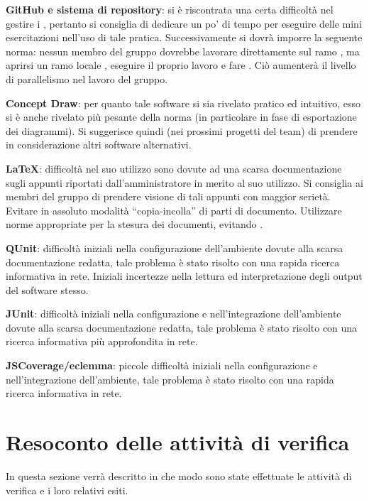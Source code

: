 \begin{description}
	\item \textbf{GitHub e sistema di repository}: si è riscontrata una certa difficoltà nel gestire i , pertanto si consiglia di dedicare un po' di tempo per eseguire delle mini esercitazioni nell'uso di tale pratica. Successivamente si dovrà imporre la seguente norma: nessun membro del gruppo dovrebbe lavorare direttamente sul ramo , ma aprirsi un ramo locale , eseguire il proprio lavoro e fare . Ciò aumenterà il livello di parallelismo nel lavoro del gruppo.
	\item \textbf{Concept Draw}: per quanto tale software si sia rivelato pratico ed intuitivo, esso si è anche rivelato più pesante della norma (in particolare in fase di esportazione dei diagrammi).  Si suggerisce quindi (nei prossimi progetti del team) di prendere in considerazione altri software alternativi.
	\item \textbf{LaTeX}: difficoltà nel suo utilizzo sono dovute ad una scarsa documentazione sugli appunti riportati dall'amministratore in merito al suo utilizzo. Si consiglia ai membri del gruppo di prendere visione di tali appunti con maggior serietà. Evitare in assoluto modalità ``copia-incolla'' di parti di documento. Utilizzare norme appropriate  per la stesura dei documenti, evitando .
	\item \textbf{QUnit}: difficoltà iniziali nella configurazione dell'ambiente dovute alla scarsa documentazione redatta, tale problema è stato risolto con una rapida ricerca informativa in rete. Iniziali incertezze nella lettura ed interpretazione degli output del software stesso.
	\item \textbf{JUnit}: difficoltà iniziali nella configurazione e nell'integrazione dell'ambiente dovute alla scarsa documentazione redatta, tale problema è stato risolto con una ricerca informativa più approfondita in rete.
	\item \textbf{JSCoverage/eclemma}: piccole difficoltà iniziali nella configurazione e nell'integrazione dell'ambiente, tale problema è stato risolto con una rapida ricerca informativa in rete.
\end{description}
\clearpage

\section{Resoconto delle attività di verifica}
In questa sezione verrà descritto in che modo sono state effettuate le attività di verifica e i loro relativi esiti.

